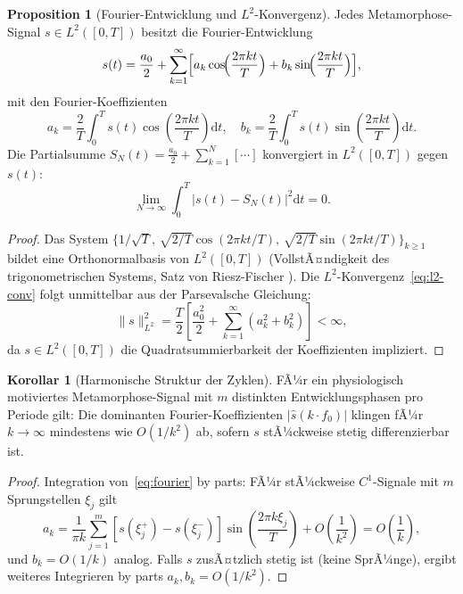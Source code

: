 ﻿\documentclass[12pt, a4paper]{article}
\theoremstyle{definition}
\newtheorem{korollar}[theorem]{Korollar}
\newtheorem{proposition}[theorem]{Proposition}
\newcommand{\dd}{\mathrm{d}}
\begin{document}
\begin{proposition}[Fourier-Entwicklung und $L^2$-Konvergenz]\label{prop:fourier}
Jedes Metamorphose-Signal $s \in L^2([0,T])$ besitzt die Fourier-Entwicklung
\begin{equation}\label{eq:fourier}
  s(t) = \frac{a_0}{2} + \sum_{k=1}^\infty \Bigl[a_k \cos\!\Bigl(\frac{2\pi k t}{T}\Bigr)
  + b_k \sin\!\Bigl(\frac{2\pi k t}{T}\Bigr)\Bigr],
\end{equation}
mit den Fourier-Koeffizienten
\[
  a_k = \frac{2}{T}\int_0^T s(t)\cos\!\left(\frac{2\pi k t}{T}\right)\dd t,\quad
  b_k = \frac{2}{T}\int_0^T s(t)\sin\!\!\left(\frac{2\pi k t}{T}\right)\dd t.
\]
Die Partialsumme $S_N(t) = \frac{a_0}{2} + \sum_{k=1}^N [\cdots]$ konvergiert in
$L^2([0,T])$ gegen $s(t)$:
\begin{equation}\label{eq:l2-conv}
  \lim_{N\to\infty} \int_0^T \bigl|s(t) - S_N(t)\bigr|^2 \dd t = 0.
\end{equation}
\end{proposition}

\begin{proof}
Das System $\{1/\sqrt{T},\, \sqrt{2/T}\cos(2\pi k t/T),\, \sqrt{2/T}\sin(2\pi k t/T)\}_{k \geq 1}$
bildet eine Orthonormalbasis von $L^2([0,T])$ (VollstÃ¤ndigkeit des trigonometrischen
Systems, Satz von Riesz-Fischer \cite{Rudin1987}). Die $L^2$-Konvergenz~\eqref{eq:l2-conv}
folgt unmittelbar aus der Parsevalsche Gleichung:
\[
  \|s\|_{L^2}^2 = \frac{T}{2}\left[\frac{a_0^2}{2} + \sum_{k=1}^\infty (a_k^2 + b_k^2)\right] < \infty,
\]
da $s \in L^2([0,T])$ die Quadratsummierbarkeit der Koeffizienten impliziert. \hfill
\end{proof}

\begin{korollar}[Harmonische Struktur der Zyklen]\label{cor:harmonisch}
FÃ¼r ein physiologisch motiviertes Metamorphose-Signal mit $m$ distinkten
Entwicklungsphasen pro Periode gilt: Die dominanten Fourier-Koeffizienten
$|\hat{s}(k\cdot f_0)|$ klingen fÃ¼r $k \to \infty$ mindestens wie $O(1/k^2)$ ab,
sofern $s$ stÃ¼ckweise stetig differenzierbar ist.
\end{korollar}

\begin{proof}
Integration von~\eqref{eq:fourier} by parts: FÃ¼r stÃ¼ckweise $C^1$-Signale mit
$m$ Sprungstellen $\xi_j$ gilt
\[
  a_k = \frac{1}{\pi k}\sum_{j=1}^m [s(\xi_j^+) - s(\xi_j^-)] \sin\!\left(\frac{2\pi k\xi_j}{T}\right)
  + O\!\left(\frac{1}{k^2}\right) = O\!\left(\frac{1}{k}\right),
\]
und $b_k = O(1/k)$ analog. Falls $s$ zusÃ¤tzlich stetig ist (keine SprÃ¼nge), ergibt
weiteres Integrieren by parts $a_k, b_k = O(1/k^2)$. \hfill
\end{proof}
\end{document}
